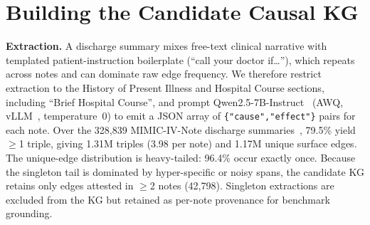 \documentclass[runningheads]{llncs}
\begin{document}
\section{Building the Candidate Causal KG}
\noindent\textbf{Extraction.} %
A discharge summary mixes free-text clinical narrative with templated patient-instruction boilerplate (``call your doctor if\ldots''), which repeats across notes and can dominate raw edge frequency. We therefore restrict extraction to the History of Present Illness and Hospital Course sections, including ``Brief Hospital Course'', and prompt Qwen2.5-7B-Instruct~\cite{qwen2025} (AWQ, vLLM~\cite{kwon2023vllm}, temperature~0) to emit a JSON array of \texttt{\{"cause","effect"\}} pairs for each note. Over the 328{,}839 MIMIC-IV-Note discharge summaries~\cite{johnson2023mimicnote}, 79.5\% yield $\geq$1 triple, giving 1.31M triples (3.98 per note) and 1.17M unique surface edges. The unique-edge distribution is heavy-tailed: 96.4\% occur exactly once. Because the singleton tail is dominated by hyper-specific or noisy spans, the candidate KG retains only edges attested in $\geq$2 notes (42{,}798). Singleton extractions are excluded from the KG but retained as per-note provenance for benchmark grounding.%
\end{document}
